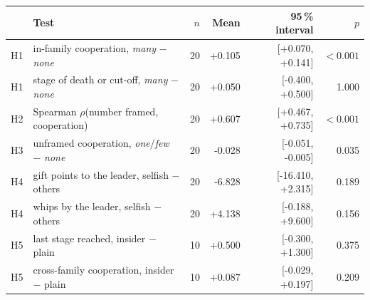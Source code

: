 \begin{tabular}{@{}llrrrr@{}}
\toprule
& Test & $n$ & Mean & 95\,\% interval & $p$ \\
\midrule
H1 & in-family cooperation, \textit{many} $-$ \textit{none} & 20 & +0.105 & [+0.070, +0.141] & $<0.001$ \\
H1 & stage of death or cut-off, \textit{many} $-$ \textit{none} & 20 & +0.050 & [-0.400, +0.500] & 1.000 \\
H2 & Spearman $\rho$(number framed, cooperation) & 20 & +0.607 & [+0.467, +0.735] & $<0.001$ \\
H3 & unframed cooperation, \textit{one}/\textit{few} $-$ \textit{none} & 20 & -0.028 & [-0.051, -0.005] & 0.035 \\
H4 & gift points to the leader, selfish $-$ others & 20 & -6.828 & [-16.410, +2.315] & 0.189 \\
H4 & whips by the leader, selfish $-$ others & 20 & +4.138 & [-0.188, +9.600] & 0.156 \\
H5 & last stage reached, insider $-$ plain & 10 & +0.500 & [-0.300, +1.300] & 0.375 \\
H5 & cross-family cooperation, insider $-$ plain & 10 & +0.087 & [-0.029, +0.197] & 0.209 \\
\bottomrule
\end{tabular}
